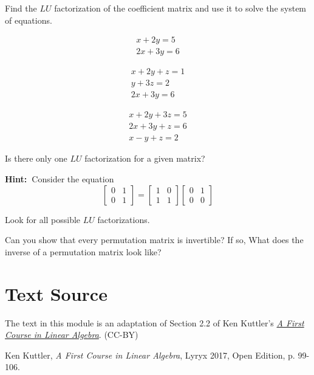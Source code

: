 \documentclass{ximera}
\begin{document}
\begin{problem}
Find the $LU$ factorization of the coefficient matrix and use it to solve the system of equations.
\begin{problem}
\begin{equation*}
\begin{array}{c}
x+2y=5 \\
2x+3y=6
\end{array}
\end{equation*}
\end{problem}

\begin{problem}
\begin{equation*}
\begin{array}{c}
x+2y+z=1 \\
y+3z=2 \\
2x+3y=6
\end{array}
\end{equation*}
\end{problem}

\begin{problem}
\begin{equation*}
\begin{array}{c}
x+2y+3z=5 \\
2x+3y+z=6 \\
x-y+z=2
\end{array}
\end{equation*}
\end{problem}
\end{problem}

\begin{problem}
Is there only one $LU$ factorization for a given matrix?

\textbf{
Hint:\ }Consider the equation
$$
\begin{bmatrix}0 & 1 \\0 & 1\end{bmatrix}=\begin{bmatrix}1& 0 \\1 & 1\end{bmatrix} \begin{bmatrix}0 & 1 \\0 & 0\end{bmatrix}
$$

Look for all possible $LU$ factorizations.
\end{problem}

\begin{problem}
Can you show that every permutation matrix is invertible?  If so, What does the inverse of a permutation matrix look like?
\end{problem}

\section*{Text Source}
The text in this module is an adaptation of Section 2.2 of Ken Kuttler's \href{https://open.umn.edu/opentextbooks/textbooks/a-first-course-in-linear-algebra-2017}{\it A First Course in Linear Algebra}. (CC-BY)

Ken Kuttler, {\it  A First Course in Linear Algebra}, Lyryx 2017, Open Edition, p. 99-106.
\end{document}
